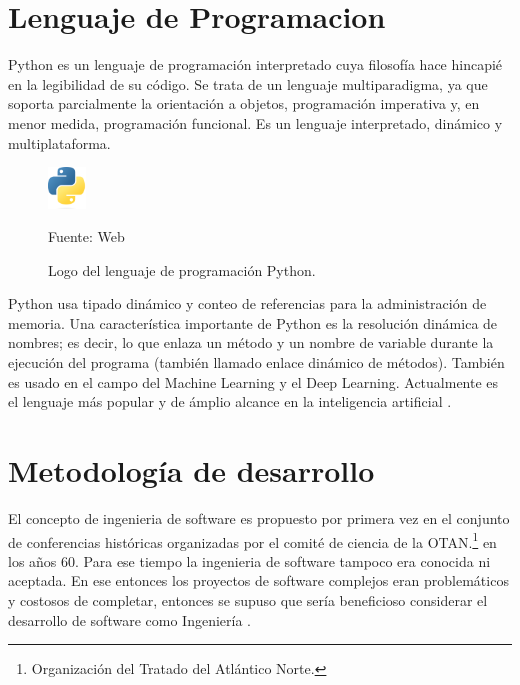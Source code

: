 \section{Lenguaje de Programacion}
Python es un lenguaje de programación interpretado cuya filosofía hace hincapié en la legibilidad de su código. Se trata de un lenguaje multiparadigma, ya que soporta parcialmente la orientación a objetos, programación imperativa y, en menor medida, programación funcional. Es un lenguaje interpretado, dinámico y multiplataforma.\\

\begin{figure}[H]
    \begin{center}
        \includegraphics[width=1cm]{img/capitulo_2/python.png}
        \caption{Logo del lenguaje de programación Python.\\}
        Fuente: Web
        \label{fig:python}
    \end{center}
\end{figure}

Python usa tipado dinámico y conteo de referencias para la administración de memoria. Una característica importante de Python es la resolución dinámica de nombres; es decir, lo que enlaza un método y un nombre de variable durante la ejecución del programa (también llamado enlace dinámico de métodos). También es usado en el campo del Machine Learning y el Deep Learning. Actualmente es el lenguaje más popular y de ámplio alcance en la inteligencia artificial \cite{python:popular}.\\

\section{Metodología de desarrollo}
El concepto de ingenieria de software es propuesto por primera vez en el conjunto de conferencias históricas organizadas por el comité de ciencia de la OTAN.\footnote{Organización del Tratado del Atlántico Norte.} en los años 60. Para ese tiempo la ingenieria de software tampoco era conocida ni aceptada. En ese entonces los proyectos de software complejos eran problemáticos y costosos de completar, entonces se supuso que sería beneficioso considerar el desarrollo de software como Ingeniería \cite{Ganis}.\\


